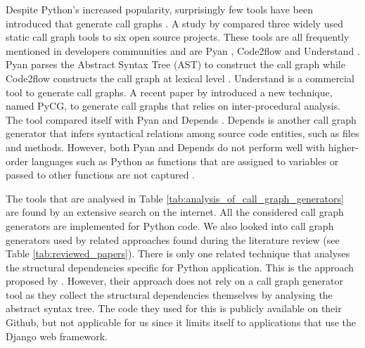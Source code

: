 Despite Python's increased popularity, surprisingly few tools have been introduced that generate call graphs \cite{salis15pycg}. A study by \citeauthor{yu2019empirical} \cite{yu2019empirical} compared three widely used static call graph tools to six open source projects. These tools are all frequently mentioned in developers communities and are Pyan \cite{fraser2018pyan3}, Code2flow \cite{rogowski2021code2flow} and Understand \cite{scitools2021understand}. Pyan parses the Abstract Syntax Tree (AST) to construct the call graph while Code2flow constructs the call graph at lexical level \cite{yu2019empirical}. Understand is a commercial tool to generate call graphs. A recent paper by \citeauthor{salis15pycg} \cite{salis15pycg} introduced a new technique, named PyCG, to generate call graphs that relies on inter-procedural analysis. The tool compared itself with Pyan \cite{fraser2018pyan3} and Depends \cite{zhang2018depends}. Depends is another call graph generator that infers syntactical relations among source code entities, such as files and methods. However, both Pyan and Depends do not perform well with higher-order languages such as Python as functions that are assigned to variables or passed to other functions are not captured \cite{salis15pycg}. \par
The tools that are analysed in Table \ref{tab:analysis_of_call_graph_generators} are found by an extensive search on the internet. All the considered call graph generators are implemented for Python code. We also looked into call graph generators used by related approaches found during the literature review (see Table \ref{tab:reviewed_papers}). There is only one related technique that analyses the structural dependencies specific for Python application. This is the approach proposed by \citeauthor{matias2020determining} \cite{matias2020determining}. However, their approach does not rely on a call graph generator tool as they collect the structural dependencies themselves by analysing the abstract syntax tree. The code they used for this is publicly available on their Github, but not applicable for us since it limits itself to applications that use the Django web framework. 

